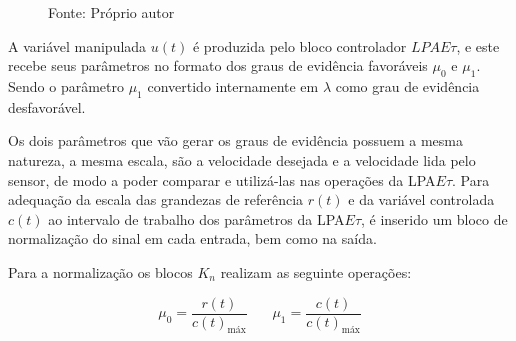 \begin{figure}[!h]
\label{fig:diagramaBlocosLPAEt}

{\vspace{0.2cm} \small Fonte: Próprio autor}
\end{figure}



A variável manipulada $u(t)$ é produzida pelo 
bloco controlador $LPAE\tau$, 
e este recebe seus parâmetros no formato dos 
graus de evidência favoráveis $\mu_0$ e $\mu_1$.
Sendo o parâmetro $\mu_1$ 
convertido internamente em $\lambda$ 
como grau de evidência desfavorável.

Os dois parâmetros que vão gerar os graus de evidência 
possuem a mesma natureza, a mesma escala, 
são a velocidade desejada e a velocidade lida pelo sensor,
de modo a poder comparar e utilizá-las nas operações da
LPA$E\tau$. 
Para adequação da escala das grandezas 
de referência $r(t)$ e da variável controlada $c(t)$
ao intervalo de trabalho dos parâmetros da LPA$E\tau$, 
é inserido um bloco de normalização do sinal em cada entrada,
bem como na saída.


Para a normalização os blocos $K_n$ realizam as seguinte operações:

\begin{equation}%
\mu_0 = \frac{ r(t)}{c(t)_{\text{máx}}} \ \ \ \ \ \ \ \ \mu_1 = \frac{c(t)}{c(t)_{\text{máx}}}
\end{equation}%

